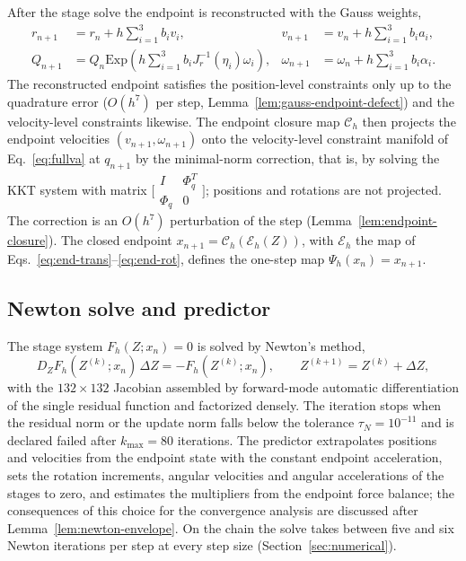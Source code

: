 After the stage solve the endpoint is reconstructed with the Gauss weights,
\begin{align}
  r_{n+1} &= r_n+h\sum_{i=1}^3 b_i v_i, &
  v_{n+1} &= v_n+h\sum_{i=1}^3 b_i a_i, \label{eq:end-trans}\\
  Q_{n+1} &= Q_n\mathrm{Exp}\!\left(h\sum_{i=1}^3 b_i J_r^{-1}(\eta_i)\omega_i\right), &
  \omega_{n+1} &= \omega_n+h\sum_{i=1}^3 b_i \alpha_i .
  \label{eq:end-rot}
\end{align}
The reconstructed endpoint satisfies the position-level constraints only up to the quadrature
error ($O(h^7)$ per step, Lemma~\ref{lem:gauss-endpoint-defect}) and the velocity-level constraints
likewise. The endpoint closure map $\mathcal C_h$ then projects the endpoint velocities
$(v_{n+1},\omega_{n+1})$ onto the velocity-level constraint manifold of Eq.~\eqref{eq:fullva} at
$q_{n+1}$ by the minimal-norm correction, that is, by solving the KKT system with matrix
$\bigl[\begin{smallmatrix}I&\Phi_q^T\\ \Phi_q&0\end{smallmatrix}\bigr]$; positions and rotations are
not projected. The correction is an $O(h^7)$ perturbation of the step (Lemma~\ref{lem:endpoint-closure}).
The closed endpoint $x_{n+1}=\mathcal C_h(\mathcal E_h(Z))$, with $\mathcal E_h$ the map of
Eqs.~\eqref{eq:end-trans}--\eqref{eq:end-rot}, defines the one-step map
$\Psi_h(x_n)=x_{n+1}$.

\subsection{Newton solve and predictor}

The stage system $F_h(Z;x_n)=0$ is solved by Newton's method,
\begin{equation}
  D_ZF_h(Z^{(k)};x_n)\,\Delta Z=-F_h(Z^{(k)};x_n),\qquad Z^{(k+1)}=Z^{(k)}+\Delta Z,
  \label{eq:newton}
\end{equation}
with the $132\times132$ Jacobian assembled by forward-mode automatic differentiation of the single
residual function and factorized densely. The iteration stops when the residual norm or the update norm falls below the tolerance
$\tau_N=10^{-11}$ and is declared failed after $k_{\max}=80$ iterations. The predictor
extrapolates positions and velocities from the endpoint state with the constant endpoint
acceleration, sets the rotation increments, angular velocities and angular accelerations of the
stages to zero, and estimates the multipliers from the endpoint force balance; the consequences of
this choice for the convergence analysis are discussed after Lemma~\ref{lem:newton-envelope}. On
the chain the solve takes between five and six Newton iterations per step at every step size
(Section~\ref{sec:numerical}).

